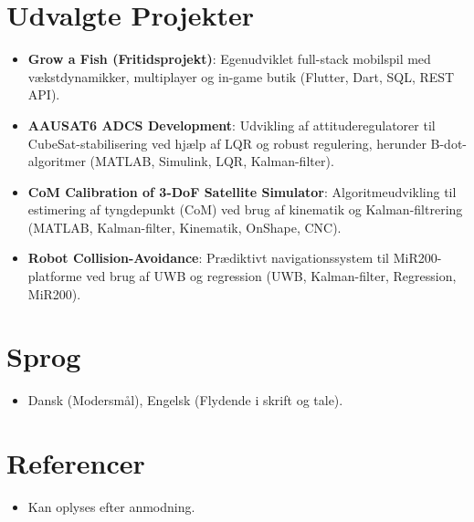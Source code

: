 \documentclass[11pt,a4paper,sans]{moderncv}
\begin{document}
\vspace{3pt}



\section{Udvalgte Projekter}
\vspace{1pt}
\begin{itemize}

\item{\textbf{Grow a Fish (Fritidsprojekt)}: Egenudviklet full-stack mobilspil med vækstdynamikker, multiplayer og in-game butik (Flutter, Dart, SQL, REST API).}

\item{\textbf{AAUSAT6 ADCS Development}: Udvikling af attituderegulatorer til CubeSat-stabilisering ved hjælp af LQR og robust regulering, herunder B-dot-algoritmer (MATLAB, Simulink, LQR, Kalman-filter).}

\item{\textbf{CoM Calibration of 3-DoF Satellite Simulator}: Algoritmeudvikling til estimering af tyngdepunkt (CoM) ved brug af kinematik og Kalman-filtrering (MATLAB, Kalman-filter, Kinematik, OnShape, CNC).}

\item{\textbf{Robot Collision-Avoidance}: Prædiktivt navigationssystem til MiR200-platforme ved brug af UWB og regression (UWB, Kalman-filter, Regression, MiR200).}

\end{itemize}


\section{Sprog}
\vspace{1pt}
\begin{itemize}
\item Dansk (Modersmål), Engelsk (Flydende i skrift og tale).
\end{itemize}


\section{Referencer}
\vspace{1pt}
\begin{itemize}
\item Kan oplyses efter anmodning.
\end{itemize}
\end{document}
